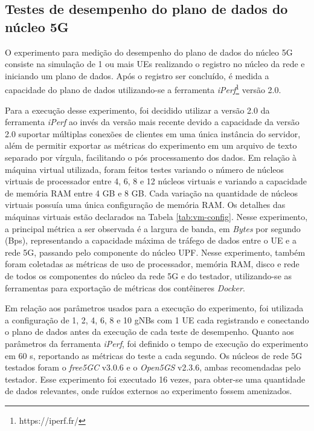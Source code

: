 \subsection{Testes de desempenho do plano de dados do núcleo 5G}

O experimento para medição do desempenho do plano de dados do núcleo 5G consiste na simulação de 1 ou mais UEs realizando o registro no núcleo da rede e iniciando um plano de dados. Após o registro ser concluído, é medida a capacidade do plano de dados utilizando-se a ferramenta \textit{iPerf}\footnote{https://iperf.fr/} versão 2.0.

Para a execução desse experimento, foi decidido utilizar a versão 2.0 da ferramenta \textit{iPerf} ao invés da versão mais recente devido a capacidade da versão 2.0 suportar múltiplas conexões de clientes em uma única instância do servidor, além de permitir exportar as métricas do experimento em um arquivo de texto separado por vírgula, facilitando o pós processamento dos dados.
Em relação à máquina virtual utilizada, foram feitos testes variando o número de núcleos virtuais de processador entre 4, 6, 8 e 12 núcleos virtuais e variando a capacidade de memória RAM entre 4 GB e 8 GB. Cada variação na quantidade de núcleos virtuais possuía uma única configuração de memória RAM. Os detalhes das máquinas virtuais estão declarados na Tabela \ref{tab:vm-config}. 
Nesse experimento, a principal métrica a ser observada é a largura de banda, em \textit{Bytes} por segundo (Bps), representando a capacidade máxima de tráfego de dados entre o UE e a rede 5G, passando pelo componente do núcleo UPF.
Nesse experimento, também foram coletadas as métricas de uso de processador, memória RAM, disco e rede de todos os componentes do núcleo da rede 5G e do testador, utilizando-se as ferramentas para exportação de métricas dos contêineres \textit{Docker}.

Em relação aos parâmetros usados para a execução do experimento, foi utilizada a configuração de 1, 2, 4, 6, 8 e 10 gNBs com 1 UE cada registrando e conectando o plano de dados antes da execução de cada teste de desempenho. Quanto aos parâmetros da ferramenta \textit{iPerf}, foi definido o tempo de execução do experimento em 60 s, reportando as métricas do teste a cada segundo.
Os núcleos de rede 5G testados foram o \textit{free5GC} v3.0.6 e o \textit{Open5GS} v2.3.6, ambas recomendadas pelo testador.
Esse experimento foi executado 16 vezes, para obter-se uma quantidade de dados relevantes, onde ruídos externos ao experimento fossem amenizados.

